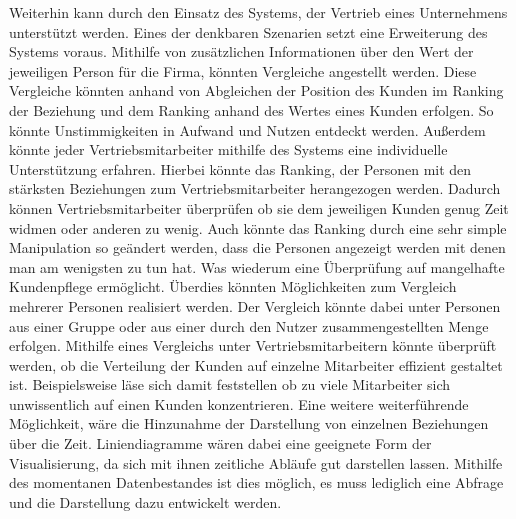 Weiterhin kann durch den Einsatz des Systems, der Vertrieb eines Unternehmens unterstützt werden. Eines der denkbaren Szenarien setzt eine Erweiterung des Systems voraus. Mithilfe von zusätzlichen Informationen über den Wert der jeweiligen Person für die Firma, könnten Vergleiche angestellt werden. Diese Vergleiche könnten anhand von Abgleichen der Position des Kunden im Ranking der Beziehung und dem Ranking anhand des Wertes eines Kunden erfolgen. So könnte Unstimmigkeiten in Aufwand und Nutzen entdeckt werden.
Außerdem könnte jeder Vertriebsmitarbeiter mithilfe des Systems eine individuelle Unterstützung erfahren. Hierbei könnte das Ranking, der Personen mit den stärksten Beziehungen zum Vertriebsmitarbeiter herangezogen werden. Dadurch können Vertriebsmitarbeiter überprüfen ob sie dem jeweiligen Kunden genug Zeit widmen oder anderen zu wenig. Auch könnte das Ranking durch eine sehr simple Manipulation so geändert werden, dass die Personen angezeigt werden mit denen man am wenigsten zu tun hat. Was wiederum eine Überprüfung auf mangelhafte Kundenpflege ermöglicht. 
Überdies könnten Möglichkeiten zum Vergleich mehrerer Personen realisiert werden. Der Vergleich könnte dabei unter Personen aus einer Gruppe oder aus einer durch den Nutzer zusammengestellten Menge erfolgen. Mithilfe eines Vergleichs unter Vertriebsmitarbeitern könnte überprüft werden, ob die Verteilung der Kunden auf einzelne Mitarbeiter effizient gestaltet ist. Beispielsweise läse sich damit feststellen ob zu viele Mitarbeiter sich unwissentlich auf einen Kunden konzentrieren.
Eine weitere weiterführende Möglichkeit, wäre die Hinzunahme der Darstellung von einzelnen Beziehungen über die Zeit. Liniendiagramme wären dabei eine geeignete Form der Visualisierung, da sich mit ihnen zeitliche Abläufe gut darstellen lassen. Mithilfe des momentanen Datenbestandes ist dies möglich, es muss lediglich eine Abfrage und die Darstellung dazu entwickelt werden.  
